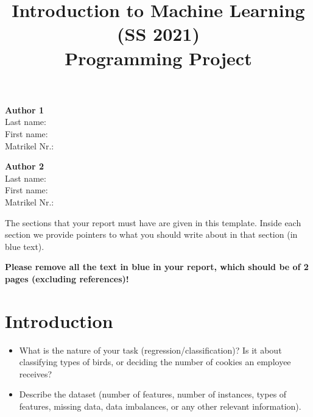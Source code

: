 \documentclass[a4, 10 pt, conference]{ieeeconf}  %
\title{\LARGE \bf
Introduction to Machine Learning (SS 2021)\\ Programming Project
\vspace{-3em}
}
\begin{document}
\maketitle
\vspace{-3em}
\thispagestyle{empty}
\pagestyle{empty}

\begin{strip}
\begin{tcolorbox}[
size=tight,
colback=white,
boxrule=0.2mm,
left=3mm,right=3mm, top=3mm, bottom=1mm
]
{\begin{multicols}{2}

\textbf{Author 1}       \\
Last name:              \\  %
First name:             \\  %
Matrikel Nr.:               \\  %

\columnbreak

\textbf{Author 2}       \\
Last name:              \\  %
First name:             \\  %
Matrikel Nr.:               \\  %

\end{multicols}}
\end{tcolorbox}
\end{strip}



{\color{blue}
\noindent The sections that your report must have are given in this template. Inside each section we provide pointers to what you should write about in that section (in blue text). 
\linebreak

\noindent \textbf{Please remove all the text in blue in your report, which should be of 2 pages (excluding references)!}
}

\section{Introduction}
\label{sec:intro}

{\color{blue}

\begin{itemize}
	\item What is the nature of your task (regression/classification)? Is it about classifying types of birds, or deciding the number of cookies an employee receives?
	\item Describe the dataset (number of features, number of instances, types of features, missing data, data imbalances, or any other relevant information).
\end{itemize}
}
\end{document}
